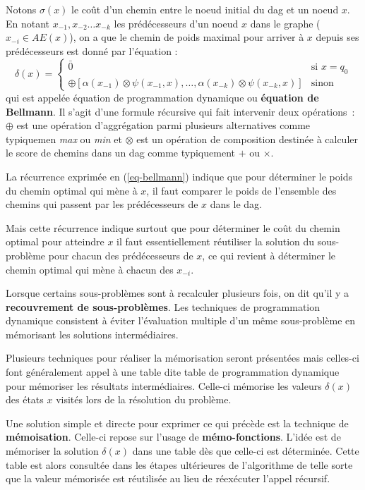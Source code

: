 \documentclass[11pt,openany]{book}
\newcommand{\ac}[1]{{\sc #1}} %
\newcommand{\kw}[1]{{\bf #1}} %
\begin{document}
Notons $\sigma(x)$ le coût d'un chemin entre le noeud initial du \ac{dag} et un noeud $x$. En notant $x_{-1},x_{-2}\ldots x_{-k}$ les prédécesseurs d'un noeud $x$ dans le graphe ($x_{-i} \in AE(x)$), on a que le chemin de poids maximal pour arriver à $x$ depuis ses prédécesseurs est donné par l'équation :
\begin{equation}
\label{eq-bellmann}
\delta(x) = \left\{ 
\begin{array}{ll}
\bar{0} & \text{si }  x = q_0\\
\oplus \left[ \alpha(x_{-1}) \otimes \psi(x_{-1},x), \ldots ,\alpha(x_{-k}) \otimes \psi(x_{-k},x) \right] &\text{sinon}
\end{array}
\right.
\end{equation}
qui est appelée équation de programmation dynamique ou \kw{équation de Bellmann}. Il s'agit d'une formule récursive qui fait intervenir deux opérations~: $\oplus$ est une opération d'aggrégation parmi plusieurs alternatives comme typiquemen {\sl max} ou {\sl min} et $\otimes$ est un opération de composition destinée à calculer le score de chemins dans un \ac{dag} comme typiquement $+$ ou $\times$. 

La récurrence exprimée en (\ref{eq-bellmann})  indique que pour déterminer le poids du chemin optimal qui mène à $x$, il faut comparer le poids de l'ensemble des chemins qui passent par les prédécesseurs de $x$ dans le \ac{dag}.

Mais cette récurrence indique surtout que pour déterminer le coût du chemin optimal pour atteindre $x$ il faut essentiellement réutiliser la solution du sous-problème pour chacun des prédécesseurs de $x$, ce qui revient à déterminer le chemin optimal qui mène à chacun des $x_{-i}$.

Lorsque certains sous-problèmes sont à recalculer plusieurs fois, on  dit qu'il y a \kw{recouvrement de sous-problèmes}. Les techniques de programmation dynamique consistent à éviter l'évaluation multiple d'un même sous-problème en mémorisant les solutions intermédiaires.

Plusieurs techniques pour réaliser la mémorisation seront présentées mais celles-ci font généralement appel à une table dite table de programmation dynamique pour mémoriser les résultats intermédiaires. Celle-ci mémorise les valeurs $\delta(x)$ des états $x$ visités lors de la résolution du problème.

Une solution simple et directe pour exprimer ce qui précède est la technique de \kw{mémoisation}. Celle-ci repose sur l'usage de \kw{mémo-fonctions}. L'idée est de mémoriser la solution $\delta(x)$ dans une table dès que celle-ci est déterminée. Cette table est alors consultée dans les étapes ultérieures de l'algorithme de telle sorte que la valeur mémorisée est réutilisée au lieu de réexécuter l'appel récursif.
\end{document}
